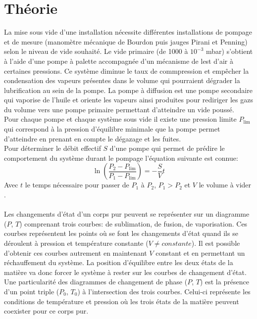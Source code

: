 \section{Théorie}

La mise sous vide d'une installation nécessite différentes installations de pompage et de mesure (manomètre mécanique de Bourdon puis jauges Pirani et Penning) selon le niveau de vide souhaité. Le vide primaire (de 1000 à \(10^{-3}\) \si{\milli \bar}) s'obtient à l'aide d'une pompe à palette accompagnée d'un mécanisme de lest d'air à certaines pressions. Ce système diminue le taux de commpression et empêcher la condensation des vapeurs présentes dans le volume qui pourraient dégrader la lubrification au sein de la pompe. La pompe à diffusion est une pompe secondaire qui vaporise de l'huile et oriente les vapeurs ainsi produites pour rediriger les gazs du volume vers une pompe primaire permettant d'atteindre un vide poussé. \\
Pour chaque pompe et chaque système sous vide il existe une pression limite \(P_\textrm{lim}\) qui correspond à la pression d'équilibre minimale que la pompe permet d'atteindre en prenant en compte le dégazage et les fuites. \\
Pour déterminer le débit effectif \(S\) d'une pompe qui permet de prédire le comportement du système durant le pompage l'équation suivante est connue:
\begin{equation}
    \ln(\frac{P_\textrm{2} - P_\textrm{lim}}{P_\textrm{1} - P_\textrm{lim}}) = -\frac{S}{V}t
    \label{eq:cinetique}
\end{equation}
Avec \(t\) le temps nécessaire pour passer de \(P_\textrm{1}\) à \(P_\textrm{2}\), \(P_\textrm{1} > P_\textrm{2}\) et \(V\) le volume à vider \cite{notice}. \\
\\
Les changements d'état d'un corps pur peuvent se représenter sur un diagramme (\(P\), \(T\)) comprenant trois courbes: de sublimation, de fusion, de vaporisation. Ces courbes représentent les points où se font les changements d'état quand ils se déroulent à pression et température constante (\(V \neq constante\)). Il est possible d'obtenir ces courbes autrement en maintenant \(V\) constant et en permettant un réchauffement du système. La position d'équilibre entre les deux états de la matière va donc forcer le système à rester sur les courbes de changement d'état. \\
Une particularité des diagrammes de changement de phase (\(P\), \(T\)) est la présence d'un point triple (\(P_\textrm{0}\), \(T_\textrm{0}\)) à l'intersection des trois courbes. Celui-ci représente les conditions de température et pression où les trois états de la matière peuvent coexister pour ce corps pur.\\
